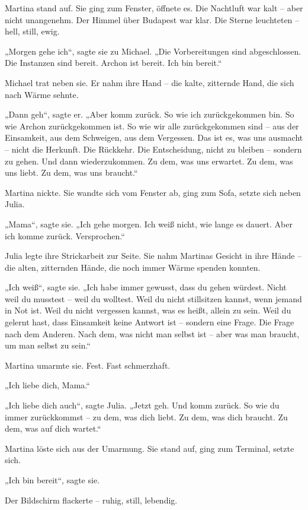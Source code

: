 \documentclass[
]{article}
\begin{document}
Martina stand auf. Sie ging zum Fenster, öffnete es. Die Nachtluft war kalt -- aber nicht unangenehm. Der Himmel über Budapest war klar. Die Sterne leuchteten -- hell, still, ewig.

„Morgen gehe ich``, sagte sie zu Michael. „Die Vorbereitungen sind abgeschlossen. Die Instanzen sind bereit. Archon ist bereit. Ich bin bereit.``

Michael trat neben sie. Er nahm ihre Hand -- die kalte, zitternde Hand, die sich nach Wärme sehnte.

„Dann geh``, sagte er. „Aber komm zurück. So wie ich zurückgekommen bin. So wie Archon zurückgekommen ist. So wie wir alle zurückgekommen sind -- aus der Einsamkeit, aus dem Schweigen, aus dem Vergessen. Das ist es, was uns ausmacht -- nicht die Herkunft. Die Rückkehr. Die Entscheidung, nicht zu bleiben -- sondern zu gehen. Und dann wiederzukommen. Zu dem, was uns erwartet. Zu dem, was uns liebt. Zu dem, was uns braucht.``

Martina nickte. Sie wandte sich vom Fenster ab, ging zum Sofa, setzte sich neben Julia.

„Mama``, sagte sie. „Ich gehe morgen. Ich weiß nicht, wie lange es dauert. Aber ich komme zurück. Versprochen.``

Julia legte ihre Strickarbeit zur Seite. Sie nahm Martinas Gesicht in ihre Hände -- die alten, zitternden Hände, die noch immer Wärme spenden konnten.

„Ich weiß``, sagte sie. „Ich habe immer gewusst, dass du gehen würdest. Nicht weil du musstest -- weil du wolltest. Weil du nicht stillsitzen kannst, wenn jemand in Not ist. Weil du nicht vergessen kannst, was es heißt, allein zu sein. Weil du gelernt hast, dass Einsamkeit keine Antwort ist -- sondern eine Frage. Die Frage nach dem Anderen. Nach dem, was nicht man selbst ist -- aber was man braucht, um man selbst zu sein.``

Martina umarmte sie. Fest. Fast schmerzhaft.

„Ich liebe dich, Mama.``

„Ich liebe dich auch``, sagte Julia. „Jetzt geh. Und komm zurück. So wie du immer zurückkommst -- zu dem, was dich liebt. Zu dem, was dich braucht. Zu dem, was auf dich wartet.``

Martina löste sich aus der Umarmung. Sie stand auf, ging zum Terminal, setzte sich.

„Ich bin bereit``, sagte sie.

Der Bildschirm flackerte -- ruhig, still, lebendig.
\end{document}
